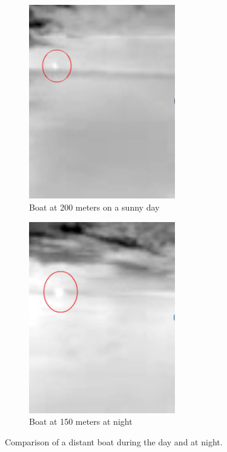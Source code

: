 \begin{figure}
\centering
\begin{subfigure}{0.45\textwidth}
 \centering
 \includegraphics[width=0.7\textwidth]{"./image/boat_horizon_circled"}
 \caption{Boat at 200 meters on a sunny day}
 \label{fig:boat_horizon:sub1}
\end{subfigure}
\begin{subfigure}{0.45\textwidth}
 \centering
 \includegraphics[width=0.7\textwidth]{"./image/boat_night_circled"}
 \caption{Boat at 150 meters at night}
 \label{fig:boat_horizon:sub2}
\end{subfigure}
\caption{Comparison of a distant boat during the day and at night.}
\label{fig:boat_horizon}
\end{figure}

